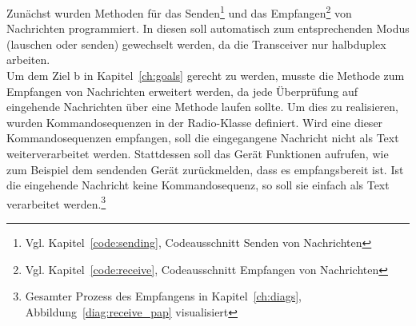 \documentclass[a4paper, 11pt]{scrartcl}
\begin{document}
Zunächst wurden Methoden für das Senden\footnote{Vgl. Kapitel~\ref{code:sending}, Codeausschnitt \glqq Senden von Nachrichten\grqq{}} und das
Empfangen\footnote{Vgl. Kapitel~\ref{code:receive}, Codeausschnitt \glqq Empfangen von Nachrichten\grqq{}} von Nachrichten programmiert. In diesen
soll automatisch zum entsprechenden Modus (lauschen oder senden) gewechselt werden, da die Transceiver nur halbduplex arbeiten.
\\
Um dem Ziel b in Kapitel~\ref{ch:goals} gerecht zu werden, musste die Methode zum Empfangen von Nachrichten erweitert werden, da jede Überprüfung auf
eingehende Nachrichten über eine Methode laufen sollte. Um dies zu realisieren, wurden Kommandosequenzen in der Radio-Klasse definiert. Wird eine dieser
Kommandosequenzen empfangen, soll die eingegangene Nachricht nicht als Text weiterverarbeitet werden. Stattdessen soll das Gerät Funktionen 
aufrufen, wie zum Beispiel dem sendenden Gerät zurückmelden, dass es empfangsbereit ist. Ist die eingehende Nachricht keine Kommandosequenz,
so soll sie einfach als Text verarbeitet werden.\footnote{Gesamter Prozess des Empfangens in Kapitel~\ref{ch:diags}, Abbildung~\ref{diag:receive_pap} visualisiert}
\end{document}
